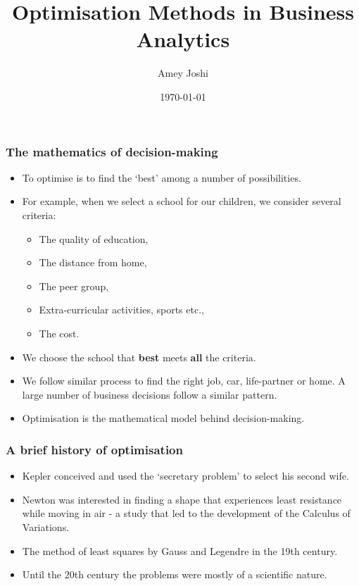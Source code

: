 \documentclass{beamer}
\title{Optimisation Methods in Business Analytics}
\author{Amey Joshi}
\date{\today}
\begin{document}
\begin{frame}
\titlepage
\end{frame}
\begin{frame}
\frametitle{The mathematics of decision-making}
\begin{itemize}
\item To optimise is to find the `best' among a number of possibilities.
\item For example, when we select a school for our children, we consider 
several criteria:
\begin{itemize}
\item The quality of education,
\item The distance from home,
\item The peer group,
\item Extra-curricular activities, sports etc.,
\item The cost.
\end{itemize}
\item We choose the school that \textbf{best} meets \textbf{all} the criteria.
\item We follow similar process to find the right job, car, life-partner or
home. A large number of business decisions follow a similar pattern.
\item Optimisation is the mathematical model behind decision-making.
\end{itemize}
\end{frame}

\begin{frame}
\frametitle{A brief history of optimisation}
\begin{itemize}
\item Kepler conceived and used the `secretary problem' to select his second
wife.
\item Newton was interested in finding a shape that experiences least 
resistance while moving in air - a study that led to the development of the
Calculus of Variations.
\item The method of least squares by Gauss and Legendre in the 19th century.
\item Until the 20th century the problems were mostly of a scientific nature.
\end{itemize}
\end{frame}
\end{document}
